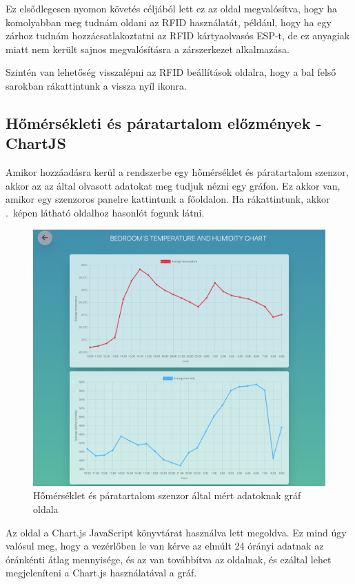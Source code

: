 \documentclass[
]{thesis-ekf}
\theoremstyle{definition}
\theoremstyle{remark}
\begin{document}
	Ez elsődlegesen nyomon követés céljából lett ez az oldal megvalósítva, hogy ha komolyabban meg tudnám oldani az RFID használatát, például, hogy ha egy zárhoz tudnám hozzácsatlakoztatni az RFID kártyaolvasós ESP-t, de ez anyagiak miatt nem került sajnos megvalósításra a zárszerkezet alkalmazása.
	
	Szintén van lehetőség visszalépni az RFID beállítások oldalra, hogy a bal felső sarokban rákattintunk a vissza nyíl ikonra.
	\subsection{Hőmérsékleti és páratartalom előzmények - ChartJS}
	
	Amikor hozzáadásra kerül a rendszerbe egy hőmérséklet és páratartalom szenzor, akkor az az által olvasott adatokat meg tudjuk nézni egy gráfon. Ez akkor van, amikor egy szenzoros panelre kattintunk a főoldalon. Ha rákattintunk, akkor .~képen látható oldalhoz hasonlót fogunk látni.
	
	\begin{figure}[ht!]
		\centering
		\includegraphics[width=1\textwidth]{./src/pages_img/humidity-chart}
		\caption{Hőmérséklet és páratartalom szenzor által mért adatoknak gráf oldala}
		\label{temp-hum-chart}
	\end{figure}

	Az oldal a Chart.js JavaScript könyvtárat használva lett megoldva. Ez mind úgy valósul meg, hogy a vezérlőben le van kérve az elmúlt 24 órányi adatnak az óránkénti átlag mennyisége, és az van továbbítva az oldalnak, és ezáltal lehet megjeleníteni a Chart.js használatával a gráf.
	
\end{document}
